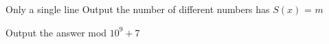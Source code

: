 Only a single line Output the number of different numbers has $S(x)$ = $m$ 

Output the answer mod $10^9 + 7$